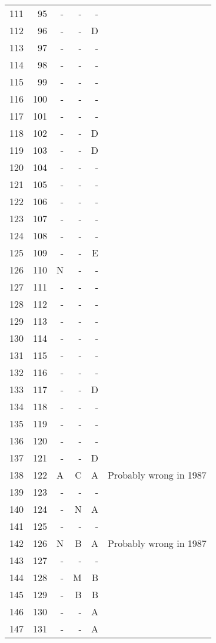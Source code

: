 \begin{longtable}{rrrrrr}
  111 & 95 & - & - & - &  \\ 
  112 & 96 & - & - & D &  \\ 
  113 & 97 & - & - & - &  \\ 
  114 & 98 & - & - & - &  \\ 
  115 & 99 & - & - & - &  \\ 
  116 & 100 & - & - & - &  \\ 
  117 & 101 & - & - & - &  \\ 
  118 & 102 & - & - & D &  \\ 
  119 & 103 & - & - & D &  \\ 
  120 & 104 & - & - & - &  \\ 
  121 & 105 & - & - & - &  \\ 
  122 & 106 & - & - & - &  \\ 
  123 & 107 & - & - & - &  \\ 
  124 & 108 & - & - & - &  \\ 
  125 & 109 & - & - & E &  \\ 
  126 & 110 & N & - & - &  \\ 
  127 & 111 & - & - & - &  \\ 
  128 & 112 & - & - & - &  \\ 
  129 & 113 & - & - & - &  \\ 
  130 & 114 & - & - & - &  \\ 
  131 & 115 & - & - & - &  \\ 
  132 & 116 & - & - & - &  \\ 
  133 & 117 & - & - & D &  \\ 
  134 & 118 & - & - & - &  \\ 
  135 & 119 & - & - & - &  \\ 
  136 & 120 & - & - & - &  \\ 
  137 & 121 & - & - & D &  \\ 
  138 & 122 & A & C & A & Probably wrong in 1987 \\ 
  139 & 123 & - & - & - &  \\ 
  140 & 124 & - & N & A &  \\ 
  141 & 125 & - & - & - &  \\ 
  142 & 126 & N & B & A & Probably wrong in 1987 \\ 
  143 & 127 & - & - & - &  \\ 
  144 & 128 & - & M & B &  \\ 
  145 & 129 & - & B & B &  \\ 
  146 & 130 & - & - & A &  \\ 
  147 & 131 & - & - & A &  \\ 

\end{longtable}
